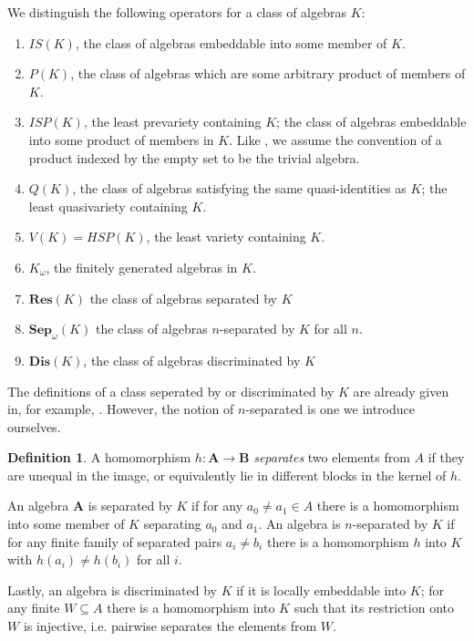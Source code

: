 \documentclass{article}
\theoremstyle{plain}
\theoremstyle{definition}
\newtheorem{definition}{Definition}[section]
\begin{document}
We distinguish the following operators for a class of algebras $K$:
\begin{enumerate}
    \item $IS(K)$, the class of algebras embeddable into some member of $K$.
    \item $P(K)$, the class of algebras which are some arbitrary product of members of $K$.
    \item $ISP(K)$, the least prevariety containing $K$; the class of algebras embeddable into some product of members in $K$.
    Like \cite{daniyarova2011algebraicgeometryalgebraicstructures}, we assume the convention of a product indexed by the empty set to be the trivial algebra.
    \item $Q(K)$, the class of algebras satisfying the same quasi-identities as $K$; the least quasivariety containing $K$.
    \item $V(K) = HSP(K)$, the least variety containing $K$.
    \item $K_\omega$, the finitely generated algebras in $K$.
    \item $\textbf{Res}(K)$ the class of algebras separated by $K$
    \item $\textbf{Sep}_\omega(K)$ the class of algebras $n$-separated by $K$ for all $n$. 
    \item $\mathbf{Dis}(K)$, the class of algebras discriminated by $K$
\end{enumerate}

The definitions of a class seperated by or discriminated by $K$ are already given in, for example, \cite{daniyarova2011algebraicgeometryalgebraicstructures}.
However, the notion of $n$-separated is one we introduce ourselves.

\begin{definition}
    A homomorphism $h \colon \mathbf{A} \rightarrow \mathbf{B}$ \textit{separates} two elements from $A$ if they are unequal in the image, or equivalently lie in different blocks in the kernel of $h$.\par
    An algebra $\mathbf{A}$ is separated by $K$ if for any $a_0\neq a_1 \in A$ there is a homomorphism into some member of $K$ separating $a_0$ and $a_1$.
    An algebra is $n$-separated by $K$ if for any finite family of separated pairs $a_i\neq b_i$ there is a homomorphism $h$ into $K$ with $h(a_i)\neq h(b_i)$ for all $i$.\par
    Lastly, an algebra is discriminated by $K$ if it is locally embeddable into $K$; for any finite $W\subseteq A$ there is a homomorphism into $K$ such that its restriction onto $W$ is injective, i.e. pairwise separates the elements from $W$.
\end{definition}
\end{document}
